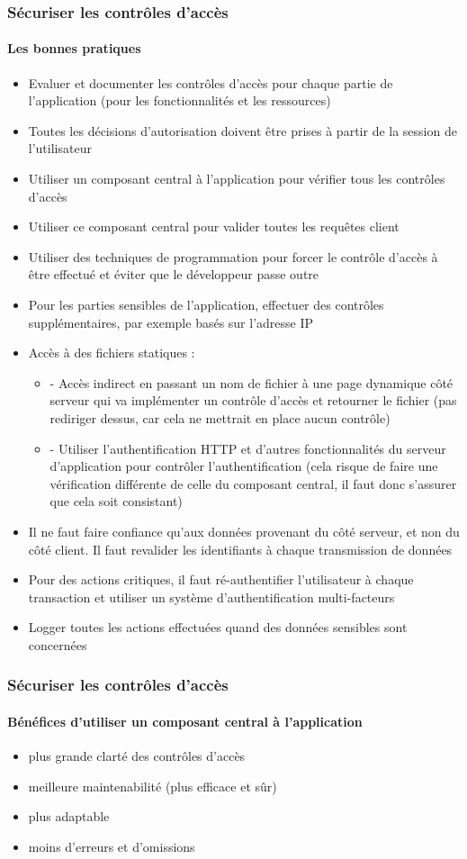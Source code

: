 \documentclass{beamer}
\begin{document}
\begin{frame}
  \frametitle{Sécuriser les contrôles d'accès}
  \framesubtitle{Les bonnes pratiques}
  \begin{itemize}
    \item Evaluer et documenter les contrôles d'accès pour chaque partie de l'application (pour les fonctionnalités et les ressources)
    \item Toutes les décisions d'autorisation doivent être prises à partir de la session de l'utilisateur
    \item Utiliser un composant central à l'application pour vérifier tous les contrôles d'accès
    \item Utiliser ce composant central pour valider toutes les requêtes client
    \item Utiliser des techniques de programmation pour forcer le contrôle d'accès à être effectué et éviter que le développeur passe outre
    \item Pour les parties sensibles de l'application, effectuer des contrôles supplémentaires, par exemple basés sur l'adresse IP
    \item Accès à des fichiers statiques : 
    \begin{itemize}
      \item - Accès indirect en passant un nom de fichier à une page dynamique côté serveur qui va implémenter un contrôle d'accès et retourner le fichier (pas rediriger dessus, car cela ne mettrait en place aucun contrôle)
      \item - Utiliser l'authentification HTTP et d'autres fonctionnalités du serveur d'application pour contrôler l'authentification (cela risque de faire une vérification différente de celle du composant central, il faut donc s'assurer que cela soit consistant)
    \end{itemize}
    \item Il ne faut faire confiance qu'aux données provenant du côté serveur, et non du côté client. Il faut revalider les identifiants à chaque transmission de données
    \item Pour des actions critiques, il faut ré-authentifier l'utilisateur à chaque transaction et utiliser un système d'authentification multi-facteurs
    \item Logger toutes les actions effectuées quand des données sensibles sont concernées
  \end{itemize}
\end{frame}

\begin{frame}
  \frametitle{Sécuriser les contrôles d'accès}
  \framesubtitle{Bénéfices d'utiliser un composant central à l'application}
  \begin{itemize}
    \item plus grande clarté des contrôles d'accès
    \item meilleure maintenabilité (plus efficace et sûr)
    \item plus adaptable
    \item moins d'erreurs et d'omissions
  \end{itemize}
\end{frame}
\end{document}
